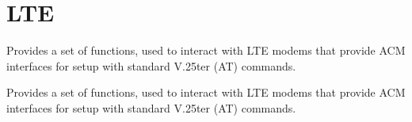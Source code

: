 \hypertarget{group__FAPI__LTE}{\section{L\-T\-E}
\label{group__FAPI__LTE}
}


Provides a set of functions, used to interact with L\-T\-E modems that provide A\-C\-M interfaces for setup with standard V.\-25ter (A\-T) commands.  


Provides a set of functions, used to interact with L\-T\-E modems that provide A\-C\-M interfaces for setup with standard V.\-25ter (A\-T) commands. 